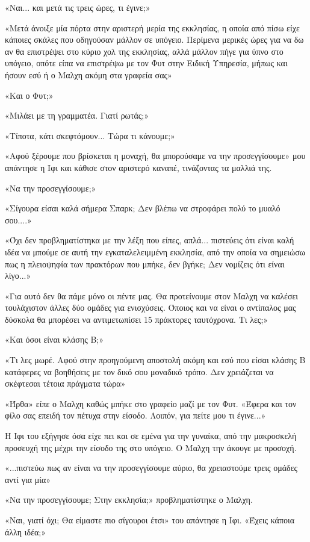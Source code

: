 \documentclass[12pt,twoside, openany]{book}
\begin{document}
«Ναι... και μετά τις τρεις ώρες, τι έγινε;»

«Μετά άνοιξε μία πόρτα στην αριστερή μερία της εκκλησίας, η οποία από πίσω είχε κάποιες σκάλες που οδηγούσαν μάλλον σε υπόγειο. Περίμενα μερικές ώρες για να δω αν θα επιστρέψει στο κύριο χολ της εκκλησίας, αλλά μάλλον πήγε για ύπνο στο υπόγειο, οπότε είπα να επιστρέψω με τον Φυτ στην Ειδική Υπηρεσία, μήπως και ήσουν εσύ ή ο Μαλχη ακόμη στα γραφεία σας»

«Και ο Φυτ;»

«Μιλάει με τη γραμματέα. Γιατί ρωτάς;»

«Τίποτα, κάτι σκεφτόμουν... Τώρα τι κάνουμε;»

«Αφού ξέρουμε που βρίσκεται η μοναχή, θα μπορούσαμε να την προσεγγίσουμε» μου απάντησε η Ιφι και κάθισε στον αριστερό καναπέ, τινάζοντας τα μαλλιά της.

«Να την προσεγγίσουμε;»

«Σίγουρα είσαι καλά σήμερα Σπαρκ; Δεν βλέπω να στροφάρει πολύ το μυαλό σου....»

«Όχι δεν προβληματίστηκα με την λέξη που είπες, απλά... πιστεύεις ότι είναι καλή ιδέα να μπούμε σε αυτή την εγκαταλελειμμένη εκκλησία, από την οποία να σημειώσω πως η πλειοψηφία των πρακτόρων που μπήκε, δεν βγήκε; Δεν νομίζεις ότι είναι λίγο...»

«Για αυτό δεν θα πάμε μόνο οι πέντε μας. Θα προτείνουμε στον Μαλχη να καλέσει τουλάχιστον άλλες δύο ομάδες για ενισχύσεις. Όποιος και να είναι ο αντίπαλος μας δύσκολα θα μπορέσει να αντιμετωπίσει 15 πράκτορες ταυτόχρονα. Τι λες;»

«Και όσοι είναι κλάσης Β;»

«Τι λες μωρέ. Αφού στην προηγούμενη αποστολή ακόμη και εσύ που είσαι κλάσης Β κατάφερες να βοηθήσεις με τον δικό σου μοναδικό τρόπο. Δεν χρειάζεται να σκέφτεσαι τέτοια πράγματα τώρα»

«Ήρθα» είπε ο Μαλχη καθώς μπήκε στο γραφείο μαζί με τον Φυτ. «Έφερα και τον φίλο σας επειδή τον πέτυχα στην είσοδο. Λοιπόν, για πείτε μου τι έγινε...»

Η Ιφι του εξήγησε όσα είχε πει και σε εμένα για την γυναίκα, από την μακροσκελή προσευχή της μέχρι την είσοδο της στο υπόγειο. Ο Μαλχη την άκουγε με προσοχή.

«...πιστεύω πως αν είναι να την προσεγγίσουμε αύριο, θα χρειαστούμε τρεις ομάδες αντί για μία»

«Να την προσεγγίσουμε; Στην εκκλησία;» προβληματίστηκε ο Μαλχη.

«Ναι, γιατί όχι; Θα είμαστε πιο σίγουροι έτσι» του απάντησε η Ιφι. «Έχεις κάποια άλλη ιδέα;»
\end{document}
